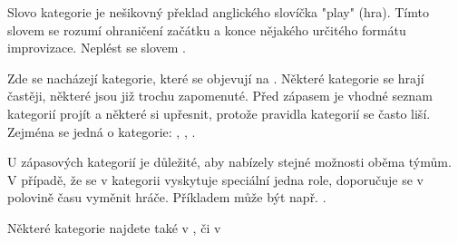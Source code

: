 \needspace{5cm} \label{kategorie} Slovo kategorie je nešikovný překlad anglického slovíčka "play"{} (hra). Tímto slovem se rozumí ohraničení začátku a konce nějakého určitého formátu improvizace. Neplést se slovem .  
 
 
\needspace{5cm} \label{kategorie:zápasové kategorie} Zde se nacházejí kategorie, které se objevují na  . Některé kategorie se hrají častěji, některé jsou již trochu zapomenuté. Před zápasem je vhodné seznam kategorií projít a některé si upřesnit, protože pravidla kategorií se často liší. Zejména se jedná o kategorie: , , . 
 
U zápasových kategorií je důležité, aby nabízely stejné možnosti oběma týmům. V případě, že se v kategorii vyskytuje speciální jedna role, doporučuje se v polovině času vyměnit hráče. Příkladem může být např. .  
 
 
Některé kategorie najdete také v  , či v  
 
 
 
